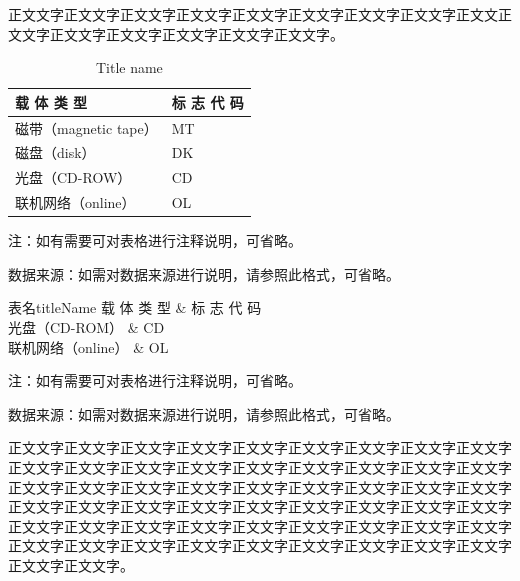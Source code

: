 \documentclass[
	StudentName     = 孙敬垚,
	StudentNameEng	= {{Name of Graduate (such as HAN Bao-cheng)}},
	AdvisorName     = {{冯兴杰 教授}},
	AdvisorNameEng	= {{Name of Supervisor and Title (such as Prof. FENG Chang-gen)}},
        AdvisorNameEngSecond = {{Name of Second Supervisor and Title}},
	StudentID		= XXXXX,
	Major           = ,
	ResearchInterest= ,
	Department		= XXXX学院,
	DepartmentEng	= {{Name of Department (or School)}},
	SubmitYear		= 202X,
	SubmitMonth		= X,
	SubmitDay		= XX,
	DefenseYear		= 202X,
	DefenseMonth	= X,
	DefenseDay		= XX,
	DefenseDateEng	= {{Date of Submit (such as April 2002)}},
	Title           = I2TDM,
	TitleEng        = {{English Title}},
	CLCNumber		= TD235,
	UDCNumber		= 624.152.5
]{cauc_thesis}
\begin{document}
正文文字正文文字正文文字正文文字正文文字正文文字正文文字正文文字正文文正文文字正文文字正文文字正文文字正文文字正文文字。

\begin{table}[!ht]
	\setlength{\abovecaptionskip}{0cm}
	\tabcolsep=1cm
	\renewcommand\arraystretch{1.2}
	\renewcommand{\tablename}{表}
	\caption{表名}
	\addtocounter{table}{-1}
	\renewcommand{\tablename}{Tab.}
	\caption{Title name}
	\label{tab:lable}
	\vspace{-10pt}
	\begin{center}
		\begin{tabular}{p{5cm}<{\centering} p{5cm}<{\centering}}
			\toprule[1.5pt]
			{{载  体  类  型}}  & {{标  志  代  码}}\\
			\midrule[1.5pt]
			{{磁带（magnetic tape）}} & MT\\
			{磁盘（disk）}  & DK\\
			{光盘（CD-ROW）}  & CD\\
			{联机网络（online）}  & OL\\
			\bottomrule[1.5pt]
		\end{tabular}
	\end{center}
	\vspace{-5pt}
	{\linespread{1.0}\setlength{\parindent}{2em}
		
		注：如有需要可对表格进行注释说明，可省略。
		
		数据来源：如需对数据来源进行说明，请参照此格式，可省略。
	}
	\vspace{-10pt}
\end{table}

\begin{thesistable}{表名}{titleName}{
	{
		{载  体  类  型}} & {{标  志  代  码}}\\
}
{
	{光盘（CD-ROM）} & CD\\
	{联机网络（online）} & OL\\
}
{
	注：如有需要可对表格进行注释说明，可省略。
	
	数据来源：如需对数据来源进行说明，请参照此格式，可省略。
}
\end{thesistable}

正文文字正文文字正文文字正文文字正文文字正文文字正文文字正文文字正文文字正文文字正文文字正文文字正文文字正文文字正文文字正文文字正文文字正文文字正文文字正文文字正文文字正文文字正文文字正文文字正文文字正文文字正文文字正文文字正文文字正文文字正文文字正文文字正文文字正文文字正文文字正文文字正文文字正文文字正文文字正文文字正文文字正文文字正文文字正文文字正文文字正文文字正文文字正文文字正文文字正文文字正文文字正文文字正文文字正文文字正文文字正文文字。
\end{document}
